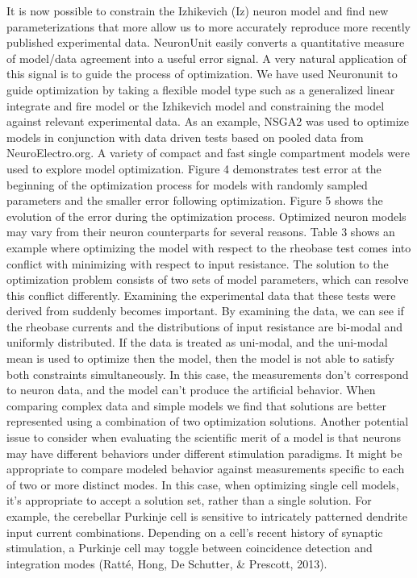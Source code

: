 It is now possible to constrain  the Izhikevich (Iz) neuron model and find new parameterizations that more allow us to more accurately reproduce more recently published experimental data.\newline
\newline
NeuronUnit easily converts a quantitative measure of model/data agreement into a useful error signal. A very natural application of this signal is to guide the process of optimization. We have used Neuronunit to guide optimization by taking a flexible model type such as a generalized linear integrate and fire model or the Izhikevich model and constraining the model against relevant experimental data. As an example, NSGA2 was used to optimize models in conjunction with data driven tests based on pooled data from NeuroElectro.org. A variety of compact and fast single compartment models were used to explore model optimization. Figure 4 demonstrates test error at the beginning of the optimization process for models with randomly sampled parameters and the smaller error following optimization. Figure 5 shows the evolution of the error during the optimization process. \newline
\newline
Optimized neuron models may vary from their neuron counterparts for several reasons. Table 3 shows an example where optimizing the model with respect to the rheobase test comes into conflict with minimizing with respect to input resistance. The solution to the optimization problem consists of two sets of model parameters, which can resolve this conflict differently. Examining the experimental data that these tests were derived from suddenly becomes important. By examining the data, we can see if the rheobase currents and the distributions of input resistance are bi-modal and uniformly distributed. If the data is treated as uni-modal, and the uni-modal mean is used to optimize then the model, then the model is not able to satisfy both constraints simultaneously. In this case, the measurements don’t correspond to neuron data, and the model can’t produce the artificial behavior. When comparing complex data and simple models we find that solutions are better represented using a combination of two optimization solutions.\newline
\newline
Another potential issue to consider when evaluating the scientific merit of a model is that neurons may have different behaviors under different stimulation paradigms. It might be appropriate to compare modeled behavior against measurements specific to each of two or more distinct modes. In this case, when optimizing single cell models, it’s appropriate to accept a solution set, rather than a single solution. For example, the cerebellar Purkinje cell is sensitive to intricately patterned dendrite input current combinations. Depending on a cell’s recent history of synaptic stimulation, a Purkinje cell may toggle between coincidence detection and integration modes (Ratté, Hong, De Schutter, \& Prescott, 2013).\newline
